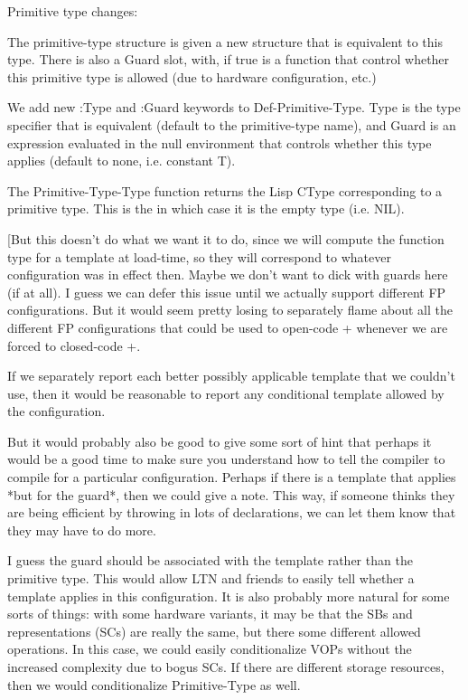 Primitive type changes:

The primitive-type structure is given a new %
structure that is equivalent to this type.  There is also a Guard slot, with,
if true is a function that control whether this primitive type is allowed (due
to hardware configuration, etc.)  

We add new :Type and :Guard keywords to Def-Primitive-Type.  Type is the type
specifier that is equivalent (default to the primitive-type name), and Guard is
an expression evaluated in the null environment that controls whether this type
applies (default to none, i.e. constant T).

The Primitive-Type-Type function returns the Lisp CType corresponding to a
primitive type.  This is the %
in which case it is the empty type (i.e. NIL).

[But this doesn't do what we want it to do, since we will compute the
function type for a template at load-time, so they will correspond to whatever
configuration was in effect then.  Maybe we don't want to dick with guards here
(if at all).  I guess we can defer this issue until we actually support
different FP configurations.  But it would seem pretty losing to separately
flame about all the different FP configurations that could be used to open-code
+ whenever we are forced to closed-code +.

If we separately report each better possibly applicable template that we
couldn't use, then it would be reasonable to report any conditional template
allowed by the configuration.  

But it would probably also be good to give some sort of hint that perhaps it
would be a good time to make sure you understand how to tell the compiler to
compile for a particular configuration.  Perhaps if there is a template that
applies *but for the guard*, then we could give a note.  This way, if someone
thinks they are being efficient by throwing in lots of declarations, we can let
them know that they may have to do more.

I guess the guard should be associated with the template rather than the
primitive type.  This would allow LTN and friends to easily tell whether a
template applies in this configuration.  It is also probably more natural for
some sorts of things: with some hardware variants, it may be that the SBs and
representations (SCs) are really the same, but there some different allowed
operations.  In this case, we could easily conditionalize VOPs without the
increased complexity due to bogus SCs.  If there are different storage
resources, then we would conditionalize Primitive-Type as well.


